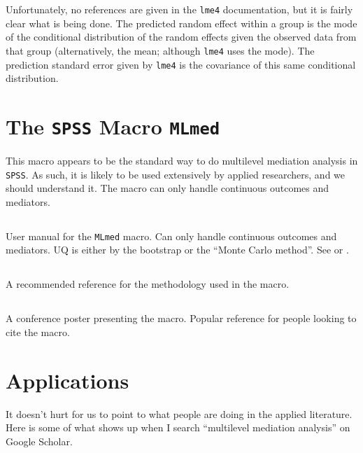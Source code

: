 \documentclass{report}
\begin{document}
Unfortunately, no references are given in the \texttt{lme4} documentation, but it is fairly clear what is being done. The predicted random effect within a group is the mode of the conditional distribution of the random effects given the observed data from that group (alternatively, the mean; although \texttt{lme4} uses the mode). The prediction standard error given by \texttt{lme4} is the covariance of this same conditional distribution. 


\section{The \texttt{SPSS} Macro \texttt{MLmed}}
\label{sec:MLmed}

This macro appears to be the standard way to do multilevel mediation analysis in \texttt{SPSS}. As such, it is likely to be used extensively by applied researchers, and we should understand it. The macro can only handle continuous outcomes and mediators.

\subsection{\citet{Roc19}}

User manual for the \texttt{MLmed} macro. Can only handle continuous outcomes and mediators. UQ is either by the bootstrap or the ``Monte Carlo method''. See \citet{Pre12} or \citet{Wil08}.

\subsection{\citet{Hay20}}

A recommended reference for the methodology used in the macro.

\subsection{\citet{Roc17}}

A conference poster presenting the macro. Popular reference for people looking to cite the macro.


\section{Applications}

It doesn't hurt for us to point to what people are doing in the applied literature. Here is some of what shows up when I search ``multilevel mediation analysis'' on Google Scholar.
\end{document}
